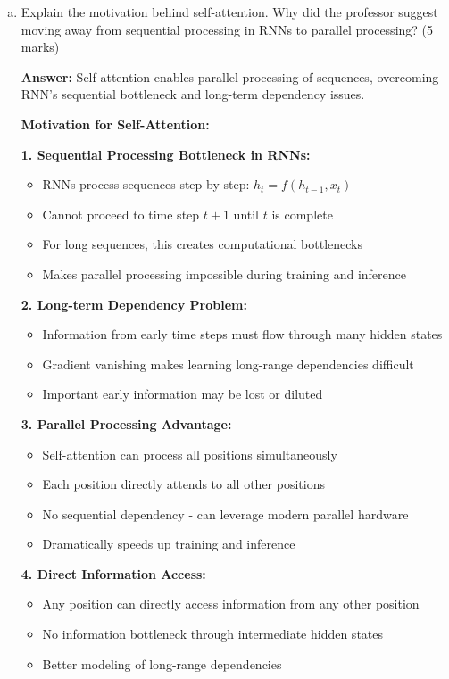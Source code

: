 \documentclass[12pt]{article}
\newcommand{\answer}[1]{{\color{answercolor}\textbf{Answer:} #1}}
\newcommand{\explanation}[1]{{\color{explanationcolor}#1}}
\begin{document}
\begin{enumerate}[(a)]
    \item Explain the motivation behind self-attention. Why did the professor suggest moving away from sequential processing in RNNs to parallel processing? \hfill (5 marks)
    
    \answer{Self-attention enables parallel processing of sequences, overcoming RNN's sequential bottleneck and long-term dependency issues.}
    
    \explanation{
    \textbf{Motivation for Self-Attention:}
    
    \textbf{1. Sequential Processing Bottleneck in RNNs:}
    \begin{itemize}
        \item RNNs process sequences step-by-step: $h_t = f(h_{t-1}, x_t)$
        \item Cannot proceed to time step $t+1$ until $t$ is complete
        \item For long sequences, this creates computational bottlenecks
        \item Makes parallel processing impossible during training and inference
    \end{itemize}
    
    \textbf{2. Long-term Dependency Problem:}
    \begin{itemize}
        \item Information from early time steps must flow through many hidden states
        \item Gradient vanishing makes learning long-range dependencies difficult
        \item Important early information may be lost or diluted
    \end{itemize}
    
    \textbf{3. Parallel Processing Advantage:}
    \begin{itemize}
        \item Self-attention can process all positions simultaneously
        \item Each position directly attends to all other positions
        \item No sequential dependency - can leverage modern parallel hardware
        \item Dramatically speeds up training and inference
    \end{itemize}
    
    \textbf{4. Direct Information Access:}
    \begin{itemize}
        \item Any position can directly access information from any other position
        \item No information bottleneck through intermediate hidden states
        \item Better modeling of long-range dependencies
    \end{itemize}
    }
    

\end{enumerate}
\end{document}
